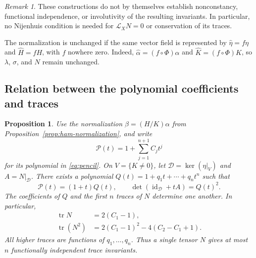 \documentclass[11pt,a4paper]{article}
\numberwithin{equation}{section}
\newtheorem{proposition}{Proposition}
\theoremstyle{definition}
\theoremstyle{remark}
\newtheorem{remark}{Remark}
\newcommand{\id}{\operatorname{id}}
\newcommand{\tr}{\operatorname{tr}}
\begin{document}
\begin{remark}
These constructions do not by themselves establish
nonconstancy, functional independence, or involutivity
of the resulting invariants. In particular, no
Nijenhuis condition is needed for
$\mathcal L_XN=0$ or conservation of its traces.

The normalization is unchanged if the same vector
field is represented by
$\widehat\eta=f\eta$ and $\widehat H=fH$, with $f$
nowhere zero. Indeed,
$\widehat\alpha=(f\circ\Phi)\alpha$ and
$\widehat K=(f\circ\Phi)K$, so $\lambda$, $\sigma$,
and $N$ remain unchanged.
\end{remark}



\subsection{Relation between the polynomial coefficients and traces}

\begin{proposition}
\label{prop:spectral}
Use the normalization $\beta=(H/K)\alpha$ from
Proposition~\ref{prop:ham-normalization}, and write
\[
\mathcal P(t)=1+\sum_{j=1}^{n+1}C_jt^j
\]
for its polynomial in \eqref{eq:pencil}.
On $V=\{K\neq0\}$, let
$\mathcal D=\ker(\eta|_V)$ and $A=N|_{\mathcal D}$. There exists a polynomial
$Q(t)=1+q_1t+\cdots+q_nt^n$ such that
\begin{equation}
\mathcal P(t)=(1+t)Q(t),\qquad
\det(\id_{\mathcal D}+tA)=Q(t)^2.
\label{eq:spectral-relation}
\end{equation}
The coefficients of $Q$ and the first $n$ traces of
$N$ determine one another. In particular,
\begin{align}
\tr N&=2(C_1-1),\\
\tr(N^2)
&=2(C_1-1)^2-4(C_2-C_1+1).
\label{eq:first-trace-relations}
\end{align}
All higher traces are functions of $q_1,\ldots,q_n$.
Thus a single tensor $N$ gives at most $n$
functionally independent trace invariants.
\end{proposition}
\end{document}
